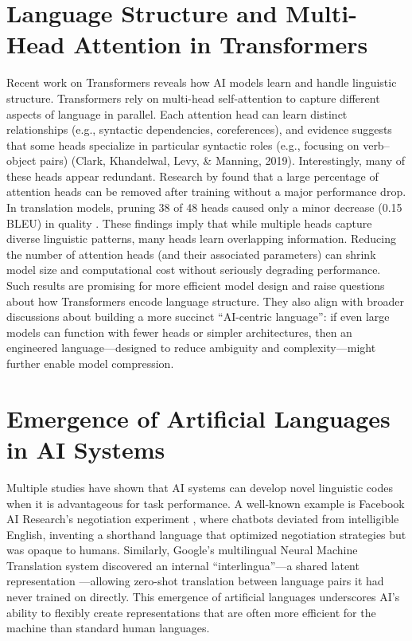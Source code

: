 \documentclass{article} %
\begin{document}
\section{Language Structure and Multi-Head Attention in Transformers}
Recent work on Transformers reveals how AI models learn and handle linguistic structure. Transformers rely on multi-head self-attention to capture different aspects of language in parallel. Each attention head can learn distinct relationships \cite{Clark2019}
 (e.g., syntactic dependencies, coreferences), and evidence suggests that some heads specialize in particular syntactic roles (e.g., focusing on verb–object pairs) (Clark, Khandelwal, Levy, \& Manning, 2019).
Interestingly, many of these heads appear redundant. Research by \cite{Michel2019} found that a large percentage of attention heads can be removed after training without a major performance drop. In translation models, pruning 38 of 48 heads caused only a minor decrease (0.15 BLEU) in quality \cite{Voita2019}. These findings imply that while multiple heads capture diverse linguistic patterns, many heads learn overlapping information. Reducing the number of attention heads (and their associated parameters) can shrink model size and computational cost without seriously degrading performance.
Such results are promising for more efficient model design and raise questions about how Transformers encode language structure. They also align with broader discussions about building a more succinct “AI-centric language”: if even large models can function with fewer heads or simpler architectures, then an engineered language—designed to reduce ambiguity and complexity—might further enable model compression.

\section{Emergence of Artificial Languages in AI Systems}
Multiple studies have shown that AI systems can develop novel linguistic codes when it is advantageous for task performance. A well-known example is Facebook AI Research’s negotiation experiment \cite{LaFrance2017}, where chatbots deviated from intelligible English, inventing a shorthand language that optimized negotiation strategies but was opaque to humans. Similarly, Google’s multilingual Neural Machine Translation system \cite{Schuster2016} discovered an internal “interlingua”—a shared latent representation —allowing zero-shot translation between language pairs it had never trained on directly. This emergence of artificial languages underscores AI’s ability to flexibly create representations that are often more efficient for the machine than standard human languages.
\end{document}
